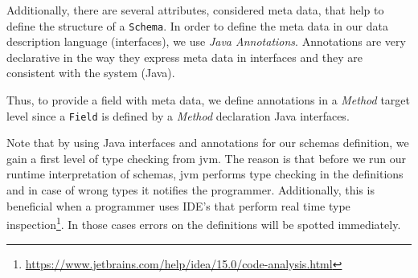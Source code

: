 Additionally, there are several attributes, considered meta data, that help to define the structure of a \texttt{Schema}.
In order to define the meta data in our data description language (interfaces), we use \textit{Java Annotations}.
Annotations are very declarative in the way they express meta data in interfaces and they are consistent with the system (Java).

Thus, to provide a field with meta data, we define annotations in a \textit{Method} target level since a \texttt{Field} is defined by a \textit{Method} declaration Java interfaces.

Note that by using Java interfaces and annotations for our schemas definition, we gain a first level of type checking from \ac{jvm}. 
The reason is that before we run our runtime interpretation of schemas, \ac{jvm} performs type checking in the definitions and in case of wrong types it notifies the programmer.
Additionally, this is beneficial when a programmer uses IDE's that perform real time type inspection\footnote{\url{https://www.jetbrains.com/help/idea/15.0/code-analysis.html}}. 
In those cases errors on the definitions will be spotted immediately. 

